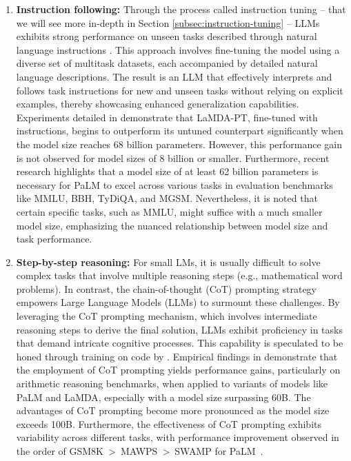 \begin{enumerate}
{\begin{enumerate}
{\begin{quote}
					            \textbf{Arithmetic Tasks:} \\
					            \textit{Input:} {\enquote{What is the sum of 42 and 63?}} \\
					            \textit{Output:} {\enquote{The sum of 42 and 63 is 105.}}
				            \end{quote}
			            }
			      \item \textbf{Instruction following:}{
				            Through the process called instruction tuning -- that we will see more in-depth in Section  \ref{subsec:instruction-tuning} -- LLMs exhibits strong performance on unseen tasks described through natural language instructions \cite{sanhetal2022multitask, ouyang2022training, wei2022fine}.
				            This approach involves fine-tuning the model using a diverse set of multitask datasets, each accompanied by detailed natural language descriptions. The result is an LLM that effectively interprets and follows task instructions for new and unseen tasks without relying on explicit examples, thereby showcasing enhanced generalization capabilities.
				            Experiments detailed in \textcite{wei2022fine} demonstrate that LaMDA-PT, fine-tuned with instructions, begins to outperform its untuned counterpart significantly when the model size reaches 68 billion parameters. However, this performance gain is not observed for model sizes of 8 billion or smaller. Furthermore, recent research \cite{chung2022scaling} highlights that a model size of at least 62 billion parameters is necessary for PaLM to excel across various tasks in evaluation benchmarks like MMLU, BBH, TyDiQA, and MGSM. Nevertheless, it is noted that certain specific tasks, such as MMLU, might suffice with a much smaller model size, emphasizing the nuanced relationship between model size and task performance.
			            }
			      \item \textbf{Step-by-step reasoning:} { For small LMs, it is usually difficult to solve complex tasks that involve multiple reasoning steps (e.g., mathematical word problems).
				            In contrast, the chain-of-thought (CoT) prompting strategy \cite{wei2022chain} empowers Large Language Models (LLMs) to surmount these challenges. By leveraging the CoT prompting mechanism, which involves intermediate reasoning steps to derive the final solution, LLMs exhibit proficiency in tasks that demand intricate cognitive processes. This capability is speculated to be honed through training on code by \textcite{wei2022chain}. Empirical findings in \textcite{wei2022chain} demonstrate that the employment of CoT prompting yields performance gains, particularly on arithmetic reasoning benchmarks, when applied to variants of models like PaLM and LaMDA, especially with a model size surpassing 60B. The advantages of CoT prompting become more pronounced as the model size exceeds 100B. Furthermore, the effectiveness of CoT prompting exhibits variability across different tasks, with performance improvement observed in the order of GSM8K~\textgreater~MAWPS~\textgreater~SWAMP for PaLM~\cite{wei2022chain}.
			            }
		      \end{enumerate}
	      }
\end{enumerate}
